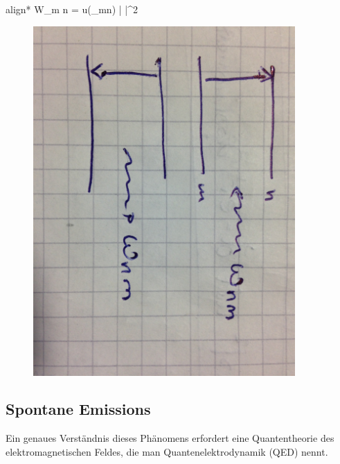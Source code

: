 	 	\begin{empheq}[box=\boxed]{align*}
		 	W_{m \leftarrow n} =  u(\omega_{mn})
		 	|  |^2
	 	\end{empheq}
	 	\begin{figure} [h]
	 		\begin{center}
	 			\includegraphics[width=10cm]{Bild1.jpg}
	 		\end{center}
		\end{figure}
	\FloatBarrier
\subsection{Spontane Emissions}
	Ein genaues Verständnis dieses Phänomens erfordert eine Quantentheorie des elektromagnetischen Feldes, die man Quantenelektrodynamik (QED) nennt. \\
	
